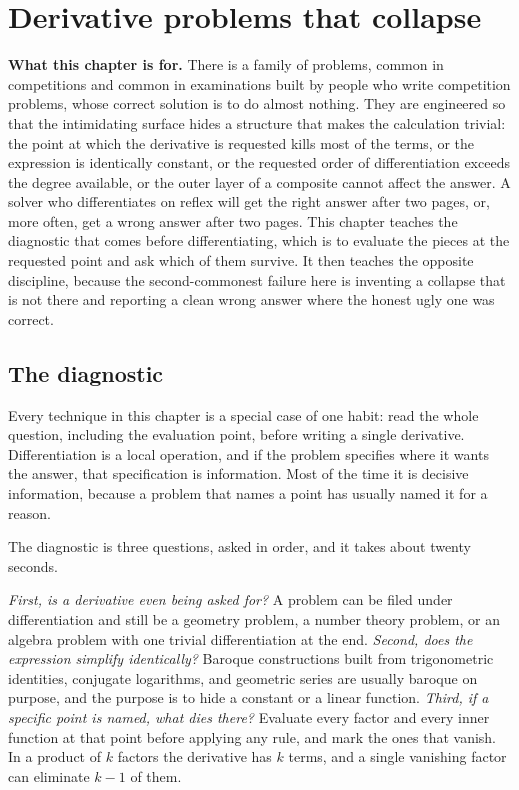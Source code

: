 \chapter{Derivative problems that collapse}

\begin{orient}
\textbf{What this chapter is for.} There is a family of problems, common in competitions and common in examinations built by people who write competition problems, whose correct solution is to do almost nothing. They are engineered so that the intimidating surface hides a structure that makes the calculation trivial: the point at which the derivative is requested kills most of the terms, or the expression is identically constant, or the requested order of differentiation exceeds the degree available, or the outer layer of a composite cannot affect the answer. A solver who differentiates on reflex will get the right answer after two pages, or, more often, get a wrong answer after two pages. This chapter teaches the diagnostic that comes before differentiating, which is to evaluate the pieces at the requested point and ask which of them survive. It then teaches the opposite discipline, because the second-commonest failure here is inventing a collapse that is not there and reporting a clean wrong answer where the honest ugly one was correct.
\end{orient}

\section{The diagnostic}

Every technique in this chapter is a special case of one habit: read the whole question, including the evaluation point, before writing a single derivative. Differentiation is a local operation, and if the problem specifies where it wants the answer, that specification is information. Most of the time it is decisive information, because a problem that names a point has usually named it for a reason.

The diagnostic is three questions, asked in order, and it takes about twenty seconds.

\emph{First, is a derivative even being asked for?} A problem can be filed under differentiation and still be a geometry problem, a number theory problem, or an algebra problem with one trivial differentiation at the end. \emph{Second, does the expression simplify identically?} Baroque constructions built from trigonometric identities, conjugate logarithms, and geometric series are usually baroque on purpose, and the purpose is to hide a constant or a linear function. \emph{Third, if a specific point is named, what dies there?} Evaluate every factor and every inner function at that point before applying any rule, and mark the ones that vanish. In a product of $k$ factors the derivative has $k$ terms, and a single vanishing factor can eliminate $k-1$ of them.

